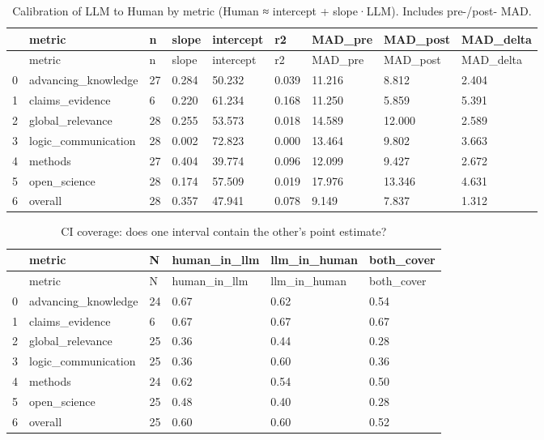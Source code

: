 \documentclass[
  11pt,
  letterpaper,
  DIV=11,
  numbers=noendperiod]{scrreprt}
\begin{document}
\hypertarget{tbl-calibration}{}
\begin{longtable}[]{@{}lllllllll@{}}
\caption{\label{tbl-calibration}Calibration of LLM to Human by metric
(Human ≈ intercept + slope·LLM). Includes pre-/post-
MAD.}\tabularnewline
\toprule()
& metric & n & slope & intercept & r2 & MAD\_pre & MAD\_post &
MAD\_delta \\
\midrule()
\endfirsthead
\toprule()
& metric & n & slope & intercept & r2 & MAD\_pre & MAD\_post &
MAD\_delta \\
\midrule()
\endhead
0 & advancing\_knowledge & 27 & 0.284 & 50.232 & 0.039 & 11.216 & 8.812
& 2.404 \\
1 & claims\_evidence & 6 & 0.220 & 61.234 & 0.168 & 11.250 & 5.859 &
5.391 \\
2 & global\_relevance & 28 & 0.255 & 53.573 & 0.018 & 14.589 & 12.000 &
2.589 \\
3 & logic\_communication & 28 & 0.002 & 72.823 & 0.000 & 13.464 & 9.802
& 3.663 \\
4 & methods & 27 & 0.404 & 39.774 & 0.096 & 12.099 & 9.427 & 2.672 \\
5 & open\_science & 28 & 0.174 & 57.509 & 0.019 & 17.976 & 13.346 &
4.631 \\
6 & overall & 28 & 0.357 & 47.941 & 0.078 & 9.149 & 7.837 & 1.312 \\
\bottomrule()
\end{longtable}

\hypertarget{tbl-coverage}{}
\begin{longtable}[]{@{}llllll@{}}
\caption{\label{tbl-coverage}CI coverage: does one interval contain the
other's point estimate?}\tabularnewline
\toprule()
& metric & N & human\_in\_llm & llm\_in\_human & both\_cover \\
\midrule()
\endfirsthead
\toprule()
& metric & N & human\_in\_llm & llm\_in\_human & both\_cover \\
\midrule()
\endhead
0 & advancing\_knowledge & 24 & 0.67 & 0.62 & 0.54 \\
1 & claims\_evidence & 6 & 0.67 & 0.67 & 0.67 \\
2 & global\_relevance & 25 & 0.36 & 0.44 & 0.28 \\
3 & logic\_communication & 25 & 0.36 & 0.60 & 0.36 \\
4 & methods & 24 & 0.62 & 0.54 & 0.50 \\
5 & open\_science & 25 & 0.48 & 0.40 & 0.28 \\
6 & overall & 25 & 0.60 & 0.60 & 0.52 \\
\bottomrule()
\end{longtable}
\end{document}
